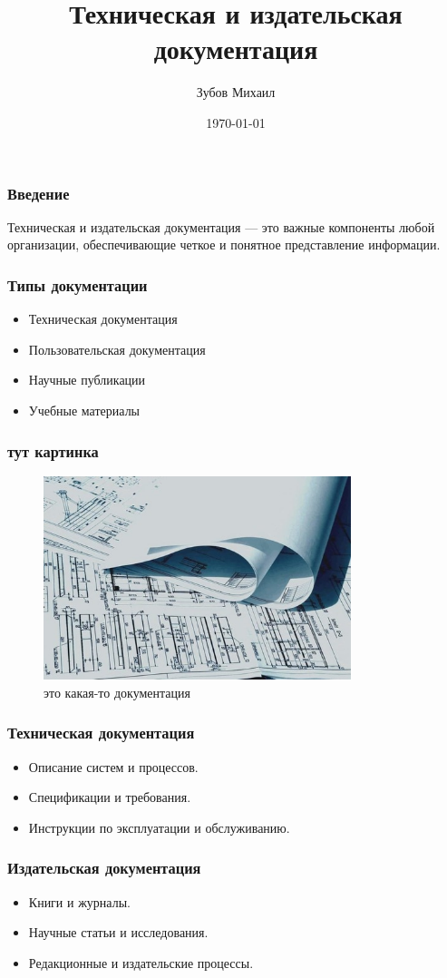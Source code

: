 \documentclass{beamer}
\title{Техническая и издательская документация}
\author{Зубов Михаил}
\date{\today}
\begin{document}
\frame{\titlepage}

\begin{frame}
\frametitle{Введение}
Техническая и издательская документация — это важные компоненты любой организации, обеспечивающие четкое и понятное представление информации.
\end{frame}

\begin{frame}
\frametitle{Типы документации}
\begin{itemize}
    \item Техническая документация
    \item Пользовательская документация
    \item Научные публикации
    \item Учебные материалы
\end{itemize}
\end{frame}

\begin{frame}
\frametitle{тут картинка}
\begin{figure}
\centering
\includegraphics[width=0.8\textwidth]{3.jpg}
\caption{это какая-то документация}
\end{figure}
\end{frame}

\begin{frame}
\frametitle{Техническая документация}
\begin{itemize}
    \item Описание систем и процессов.
    \item Спецификации и требования.
    \item Инструкции по эксплуатации и обслуживанию.
\end{itemize}
\end{frame}

\begin{frame}
\frametitle{Издательская документация}
\begin{itemize}
    \item Книги и журналы.
    \item Научные статьи и исследования.
    \item Редакционные и издательские процессы.
\end{itemize}
\end{frame}
\end{document}

